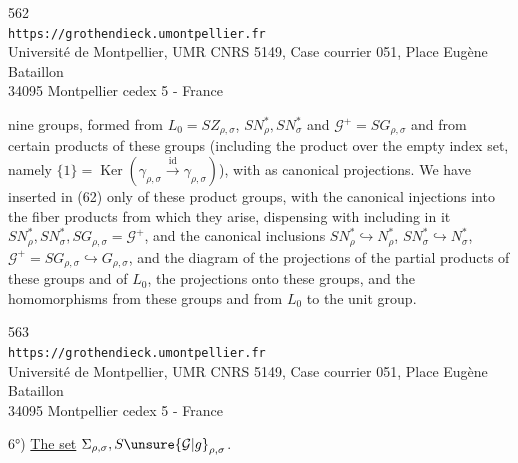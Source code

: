 
{\small
\begin{center}
562\\
\texttt{https://grothendieck.umontpellier.fr}\\
Université de Montpellier, UMR CNRS 5149, Case courrier 051, Place Eugène Bataillon\\
34095 Montpellier cedex 5 - France
\end{center}
}


nine groups,  formed from $L_{0}=SZ_{\rho,\sigma}$, $SN_{\rho}^{*},SN_{\sigma}^{*}$ and $\mathcal{G}^{+}=SG_{\rho,\sigma}$ and from certain products of these groups (including the product over the empty index set, namely $\{1\}=\operatorname{Ker}(\gamma_{\rho,\sigma}\xrightarrow{\mathrm{id}}\gamma_{\rho,\sigma})$), with as  canonical projections. We have inserted in (62) only  of these product groups, with the canonical injections into the fiber products from which they arise,  dispensing with including in it  $SN_{\rho}^{*},SN_{\sigma}^{*},SG_{\rho,\sigma}=\mathcal{G}^{+}$, and the canonical inclusions $SN_{\rho}^{*}\hookrightarrow N_{\rho}^{*}$, $SN_{\sigma}^{*}\hookrightarrow N_{\sigma}^{*}$, $\mathcal{G}^{+}=SG_{\rho,\sigma}\hookrightarrow G_{\rho,\sigma}$, and the   diagram of the projections of the partial products of these groups and of $L_{0}$,   the projections onto these  groups, and the homomorphisms from these groups and from $L_{0}$ to the unit group.


{\small
\begin{center}
563\\
\texttt{https://grothendieck.umontpellier.fr}\\
Université de Montpellier, UMR CNRS 5149, Case courrier 051, Place Eugène Bataillon\\
34095 Montpellier cedex 5 - France
\end{center}
}


6°) \uline{The set} $\Sigma_{\rho,\sigma},S\unsure{\mathcal{G}|g}_{\rho,\sigma}$.

